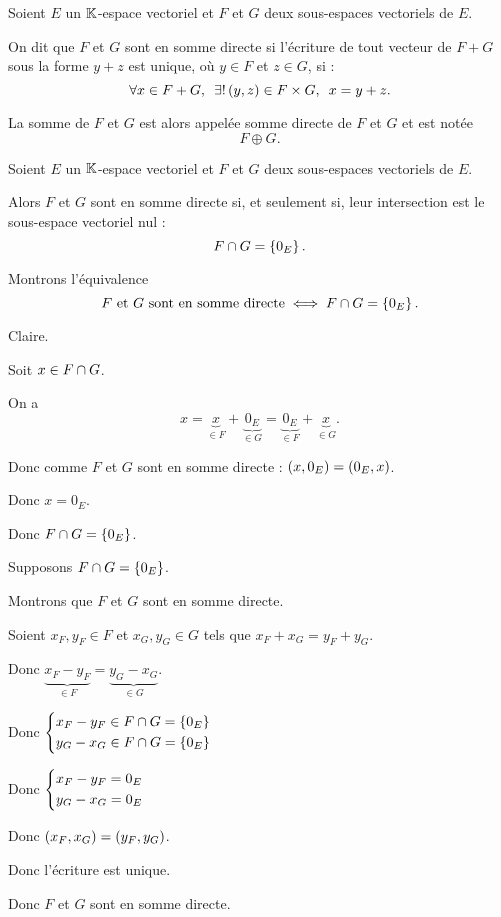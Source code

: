 \begin{defi}
Soient \(E\) un \(\mathbb{K}\)-espace vectoriel et \(F\) et \(G\) deux sous-espaces vectoriels de \(E\).

On dit que \(F\) et \(G\) sont en somme directe si l'écriture de tout vecteur de \(F+G\) sous la forme \(y+z\) est unique, où \(y\in F\) et \(z\in G\), \cad si : \[\quantifs{\forall x\in F+G;\exists!\paren{y,z}\in F\times G}x=y+z.\]

La somme de \(F\) et \(G\) est alors appelée somme directe de \(F\) et \(G\) et est notée \[F\oplus G.\]
\end{defi}

\begin{prop}
Soient \(E\) un \(\mathbb{K}\)-espace vectoriel et \(F\) et \(G\) deux sous-espaces vectoriels de \(E\).

Alors \(F\) et \(G\) sont en somme directe si, et seulement si, leur intersection est le sous-espace vectoriel nul : \[F\cap G=\left\lbrace0_E\right\rbrace.\]
\end{prop}

\begin{dem}
Montrons l'équivalence \[F\text{ et }G\text{ sont en somme directe}\iff F\cap G=\left\lbrace0_E\right\rbrace.\]

\impdir

\increc Claire.

\incdir

Soit \(x\in F\cap G\).

On a \[x=\underbrace{x}_{\in F}+\underbrace{0_E}_{\in G}=\underbrace{0_E}_{\in F}+\underbrace{x}_{\in G}.\]

Donc comme \(F\) et \(G\) sont en somme directe : \(\left(x,0_E\right)=\left(0_E,x\right)\).

Donc \(x=0_E\).

Donc \(F\cap G=\left\lbrace0_E\right\rbrace\).

\imprec

Supposons \(F\cap G=\left\lbrace0_E\right\rbrace\).

Montrons que \(F\) et \(G\) sont en somme directe.

Soient \(x_F,y_F\in F\) et \(x_G,y_G\in G\) tels que \(x_F+x_G=y_F+y_G\).

Donc \(\underbrace{x_F-y_F}_{\in F}=\underbrace{y_G-x_G}_{\in G}\).

Donc \(\begin{dcases}x_F-y_F\in F\cap G=\left\lbrace0_E\right\rbrace \\ y_G-x_G\in F\cap G=\left\lbrace0_E\right\rbrace\end{dcases}\)

Donc \(\begin{dcases}x_F-y_F=0_E \\ y_G-x_G=0_E\end{dcases}\)

Donc \(\left(x_F,x_G\right)=\left(y_F,y_G\right)\).

Donc l'écriture est unique.

Donc \(F\) et \(G\) sont en somme directe.
\end{dem}

